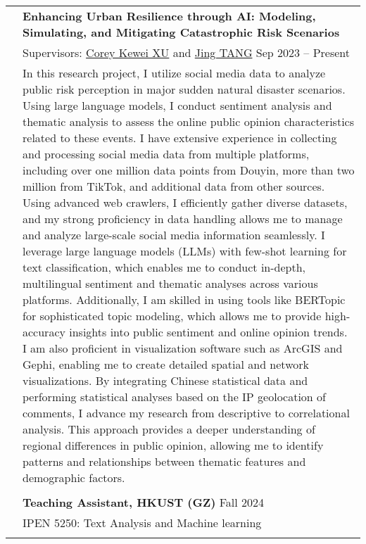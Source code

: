 \documentclass[letterpaper, 11pt]{article}
\begin{document}
\begin{longtable}{p{1.3in}p{4.8in}}
& \textbf{Enhancing Urban Resilience through AI: Modeling, Simulating, and Mitigating Catastrophic Risk Scenarios
} \\
& Supervisors: \href{https://facultyprofiles.hkust-gz.edu.cn/faculty-personal-page/XU-Kewei/coreyxu}{Corey Kewei XU} and \href{https://facultyprofiles.hkust-gz.edu.cn/faculty-personal-page/TANG-Jing/jingtang}{Jing TANG} \hfill Sep 2023 -- Present \\
& In this research project, I utilize social media data to analyze public risk perception in major sudden natural disaster scenarios. Using large language models, I conduct sentiment analysis and thematic analysis to assess the online public opinion characteristics related to these events. I have extensive experience in collecting and processing social media data from multiple platforms, including over one million data points from Douyin, more than two million from TikTok, and additional data from other sources. Using advanced web crawlers, I efficiently gather diverse datasets, and my strong proficiency in data handling allows me to manage and analyze large-scale social media information seamlessly. I leverage large language models (LLMs) with few-shot learning for text classification, which enables me to conduct in-depth, multilingual sentiment and thematic analyses across various platforms. Additionally, I am skilled in using tools like BERTopic for sophisticated topic modeling, which allows me to provide high-accuracy insights into public sentiment and online opinion trends. I am also proficient in visualization software such as ArcGIS and Gephi, enabling me to create detailed spatial and network visualizations. By integrating Chinese statistical data and performing statistical analyses based on the IP geolocation of comments, I advance my research from descriptive to correlational analysis. This approach provides a deeper understanding of regional differences in public opinion, allowing me to identify patterns and relationships between thematic features and demographic factors.\\
& \\


{\color{RoyalBlue}{Teaching Experience}} 
& \textbf{Teaching Assistant, HKUST (GZ)} \hfill Fall 2024 \\
& IPEN 5250: Text Analysis and Machine learning \\
& \\


\end{longtable}
\end{document}

